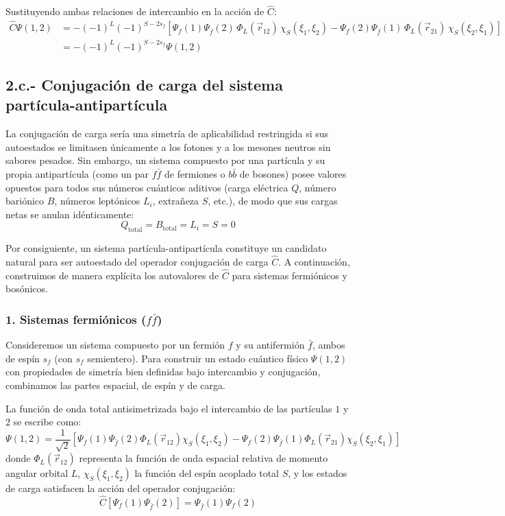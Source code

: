 Sustituyendo ambas relaciones de intercambio en la acción de $\hat{C}$:
\begin{align}
    \hat{C}\Psi(1,2) &= -(-1)^L (-1)^{S - 2s_f} \left[ \Psi_f(1)\Psi_{\bar{f}}(2) \, \Phi_L(\vec{r}_{12}) \, \chi_S(\xi_1,\xi_2) - \Psi_f(2)\Psi_{\bar{f}}(1) \, \Phi_L(\vec{r}_{21}) \, \chi_S(\xi_2,\xi_1) \right] \nonumber \\
    &= -(-1)^L (-1)^{S - 2s_f} \Psi(1,2)
\end{align}

\newpage
\subsection{2.c.- Conjugación de carga del sistema partícula-antipartícula}

La conjugación de carga sería una simetría de aplicabilidad restringida si sus autoestados se limitasen únicamente a los fotones y a los mesones neutros sin sabores pesados. Sin embargo, un sistema compuesto por una partícula y su propia antipartícula (como un par $f\bar{f}$ de fermiones o $b\bar{b}$ de bosones) posee valores opuestos para todos sus números cuánticos aditivos (carga eléctrica $Q$, número bariónico $B$, números leptónicos $L_i$, extrañeza $S$, etc.), de modo que sus cargas netas se anulan idénticamente:
\begin{equation}
    Q_{\text{total}} = B_{\text{total}} = L_i = S = 0
\end{equation}

Por consiguiente, un sistema partícula-antipartícula constituye un candidato natural para ser autoestado del operador conjugación de carga $\hat{C}$. A continuación, construimos de manera explícita los autovalores de $\hat{C}$ para sistemas fermiónicos y bosónicos.

\subsubsection*{1. Sistemas fermiónicos ($f\bar{f}$)}

Consideremos un sistema compuesto por un fermión $f$ y su antifermión $\bar{f}$, ambos de espín $s_f$ (con $s_f$ semientero). Para construir un estado cuántico físico $\Psi(1,2)$ con propiedades de simetría bien definidas bajo intercambio y conjugación, combinamos las partes espacial, de espín y de carga.

La función de onda total antisimetrizada bajo el intercambio de las partículas $1$ y $2$ se escribe como:
\begin{equation}
    \Psi(1,2) = \frac{1}{\sqrt{2}} \left[ \Psi_f(1) \Psi_{\bar{f}}(2) \Phi_L(\vec{r}_{12}) \chi_S(\xi_1, \xi_2) - \Psi_f(2) \Psi_{\bar{f}}(1) \Phi_L(\vec{r}_{21}) \chi_S(\xi_2, \xi_1) \right]
\end{equation}
donde $\Phi_L(\vec{r}_{12})$ representa la función de onda espacial relativa de momento angular orbital $L$, $\chi_S(\xi_1, \xi_2)$ la función del espín acoplado total $S$, y los estados de carga satisfacen la acción del operador conjugación:
\begin{equation}
    \hat{C} \left[ \Psi_f(1) \Psi_{\bar{f}}(2) \right] = \Psi_{\bar{f}}(1) \Psi_f(2)
\end{equation}

